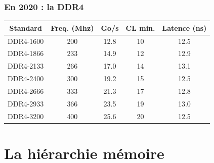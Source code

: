 \documentclass[xcolor={x11names,svgnames}]{beamer}
\begin{document}
\begin{frame}
  \frametitle{En 2020 : la DDR4}

   
  \bigskip
  
  \small
  \begin{tabular}{|c|c|c|c|c|}
  \hline
Standard   & Freq. (Mhz) & Go/s  & CL min. & Latence (ns) \\
  \hline\hline                                                                    
DDR4-1600  & 200         & 12.8 & 10      & 12.5   \\
DDR4-1866  & 233         & 14.9 & 12      & 12.9 \\
DDR4-2133  & 266         & 17.0 & 14      & 13.1 \\
DDR4-2400  & 300         & 19.2 & 15      & 12.5   \\
DDR4-2666  & 333         & 21.3 & 17      & 12.8  \\
DDR4-2933  & 366         & 23.5 & 19      & 13.0  \\
DDR4-3200  & 400         & 25.6 & 20      & 12.5   \\
  \hline                                                                                            
\end{tabular}
\end{frame}


\section{La hiérarchie mémoire}

\end{document}
